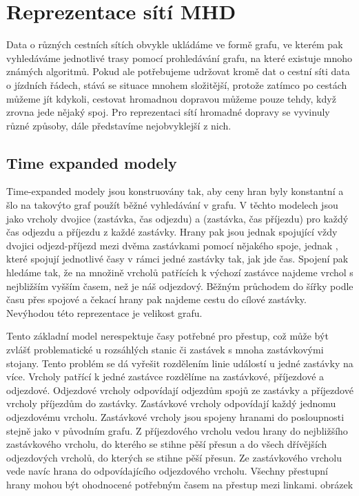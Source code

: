 \chapter{Reprezentace sítí MHD}
Data o různých cestních sítích obvykle ukládáme ve formě grafu, ve kterém pak
vyhledáváme jednotlivé trasy pomocí prohledávání grafu, na které existuje mnoho
známých algoritmů. Pokud ale potřebujeme udržovat kromě dat o cestní síti data o
jízdních řádech, stává se situace mnohem složitější, protože zatímco po cestách
můžeme jít kdykoli, cestovat hromadnou dopravou můžeme pouze tehdy, když zrovna
jede nějaký spoj. Pro reprezentaci sítí hromadné dopravy se vyvinuly různé
způsoby, dále představíme nejobvyklejší z nich.

\section{Time expanded modely}
Time-expanded modely \cite{time-expanded} jsou konstruovány tak, aby ceny hran
byly konstantní a šlo na takovýto graf použít běžné vyhledávání v grafu. V
těchto modelech jsou jako vrcholy dvojice (zastávka, čas odjezdu) a (zastávka,
čas příjezdu) pro každý čas odjezdu a příjezdu z každé zastávky. Hrany pak
jsou jednak  spojující vždy dvojici odjezd-příjezd mezi dvěma
zastávkami pomocí nějakého spoje, jednak , které spojují jednotlivé
časy v rámci jedné zastávky tak, jak jde čas. Spojení pak hledáme tak, že na
množině vrcholů patřících k výchozí zastávce najdeme vrchol s nejbližším vyšším
časem, než je náš odjezdový. Běžným průchodem do šířky podle času přes spojové a
čekací hrany pak najdeme cestu do cílové zastávky. Nevýhodou této reprezentace
je velikost grafu.

Tento základní model nerespektuje časy potřebné pro přestup, což může být
zvlášť problematické u rozsáhlých stanic či zastávek s mnoha zastávkovými
stojany. Tento problém se dá vyřešit rozdělením linie událostí u jedné zastávky
na více. Vrcholy patřící k jedné zastávce rozdělíme na zastávkové, příjezdové a
odjezdové. Odjezdové vrcholy odpovídají odjezdům spojů ze zastávky a příjezdové
vrcholy příjezdům do zastávky. Zastávkové vrcholy odpovídají každý jednomu
odjezdovému vrcholu. Zastávkové vrcholy jsou spojeny hranami do posloupnosti
stejně jako v původním grafu. Z příjezdového vrcholu vedou hrany do nejbližšího
zastávkového vrcholu, do kterého se stihne pěší přesun a do všech dřívějších
odjezdových vrcholů, do kterých se stihne pěší přesun. Ze zastávkového vrcholu
vede navíc hrana do odpovídajícího odjezdového vrcholu. Všechny přestupní hrany
mohou být ohodnocené potřebným časem na přestup mezi linkami. 
\TODO obrázek

